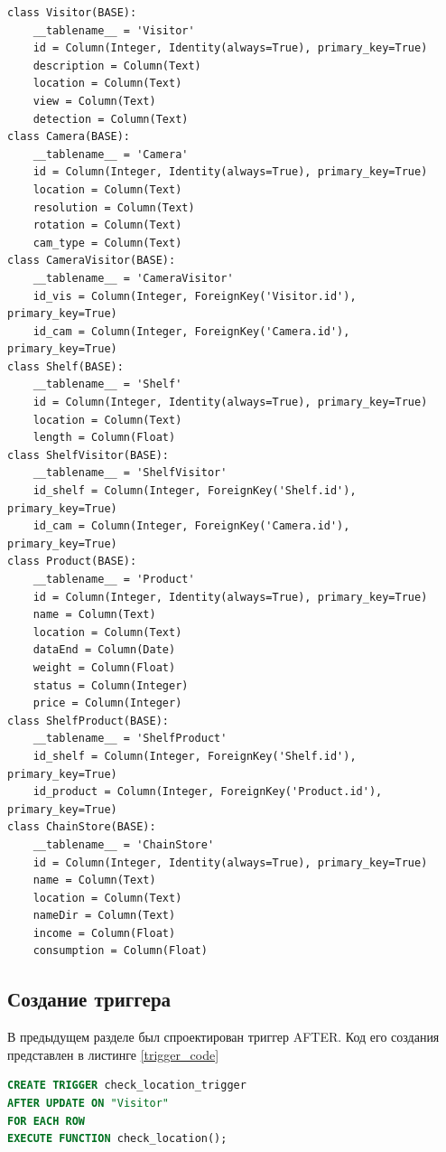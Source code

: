 \begin{lstlisting}[label=dbcreate, caption=Создание БД]
class Visitor(BASE):
    __tablename__ = 'Visitor'
    id = Column(Integer, Identity(always=True), primary_key=True)
    description = Column(Text)
    location = Column(Text)
    view = Column(Text)
    detection = Column(Text)
class Camera(BASE):
    __tablename__ = 'Camera'
    id = Column(Integer, Identity(always=True), primary_key=True)
    location = Column(Text)
    resolution = Column(Text)
    rotation = Column(Text)
    cam_type = Column(Text)
class CameraVisitor(BASE):
    __tablename__ = 'CameraVisitor'
    id_vis = Column(Integer, ForeignKey('Visitor.id'), primary_key=True)
    id_cam = Column(Integer, ForeignKey('Camera.id'), primary_key=True)
class Shelf(BASE):
    __tablename__ = 'Shelf'
    id = Column(Integer, Identity(always=True), primary_key=True)
    location = Column(Text)
    length = Column(Float)
class ShelfVisitor(BASE):
    __tablename__ = 'ShelfVisitor'
    id_shelf = Column(Integer, ForeignKey('Shelf.id'), primary_key=True)
    id_cam = Column(Integer, ForeignKey('Camera.id'), primary_key=True)
class Product(BASE):
    __tablename__ = 'Product'
    id = Column(Integer, Identity(always=True), primary_key=True)
    name = Column(Text)
    location = Column(Text)
    dataEnd = Column(Date)
    weight = Column(Float)
    status = Column(Integer)
    price = Column(Integer)
class ShelfProduct(BASE):
    __tablename__ = 'ShelfProduct'
    id_shelf = Column(Integer, ForeignKey('Shelf.id'), primary_key=True)
    id_product = Column(Integer, ForeignKey('Product.id'), primary_key=True)
class ChainStore(BASE):
    __tablename__ = 'ChainStore'
    id = Column(Integer, Identity(always=True), primary_key=True)
    name = Column(Text)
    location = Column(Text)
    nameDir = Column(Text)
    income = Column(Float)
    consumption = Column(Float)
\end{lstlisting}

\subsection{\large Создание триггера}

В предыдущем разделе был спроектирован триггер AFTER.
Код его создания представлен в листинге \ref{trigger_code}

\captionsetup{singlelinecheck = false, justification=raggedright}
\begin{lstlisting}[language=sql, caption=Реализация триггера AFTER, label=trigger_code]
CREATE TRIGGER check_location_trigger
AFTER UPDATE ON "Visitor"
FOR EACH ROW
EXECUTE FUNCTION check_location();
\end{lstlisting}
\captionsetup{singlelinecheck = false, justification=centering}

